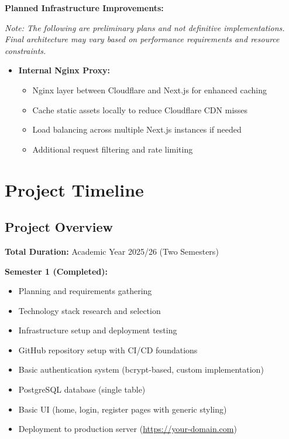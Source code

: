 \documentclass[12pt,a4paper]{article}
\begin{document}
\textbf{Planned Infrastructure Improvements:}

\textit{Note: The following are preliminary plans and not definitive implementations. Final architecture may vary based on performance requirements and resource constraints.}

\begin{itemize}
    \item \textbf{Internal Nginx Proxy:}
    \begin{itemize}
        \item Nginx layer between Cloudflare and Next.js for enhanced caching
        \item Cache static assets locally to reduce Cloudflare CDN misses
        \item Load balancing across multiple Next.js instances if needed
        \item Additional request filtering and rate limiting
    \end{itemize}
\end{itemize}

\newpage
\section{Project Timeline}

\subsection{Project Overview}

\textbf{Total Duration:} Academic Year 2025/26 (Two Semesters)

\textbf{Semester 1 (Completed):}
\begin{itemize}
    \item Planning and requirements gathering
    \item Technology stack research and selection
    \item Infrastructure setup and deployment testing
    \item GitHub repository setup with CI/CD foundations
    \item Basic authentication system (bcrypt-based, custom implementation)
    \item PostgreSQL database (single table)
    \item Basic UI (home, login, register pages with generic styling)
    \item Deployment to production server (\url{https://your-domain.com})
\end{itemize}
\end{document}
